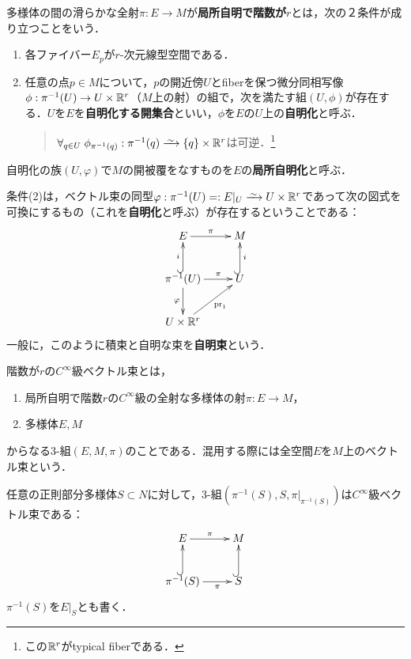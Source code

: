 \documentclass[uplatex,dvipdfmx]{jsreport}
\begin{document}
\begin{definition}[trivialization]
    多様体の間の滑らかな全射$\pi:E\to M$が\textbf{局所自明で階数が$r$}とは，次の２条件が成り立つことをいう．
    \begin{enumerate}
        \item 各ファイバー$E_p$が$r$-次元線型空間である．
        \item 任意の点$p\in M$について，$p$の開近傍$U$とfiberを保つ微分同相写像$\phi:\pi^{-1}(U)\to U\times\mathbb{R}^r$（$M$上の射）の組で，次を満たす組$(U,\phi)$が存在する．$U$を$E$を\textbf{自明化する開集合}といい，$\phi$を$E$の$U$上の\textbf{自明化}と呼ぶ．
        \begin{quote}
            $\forall_{q\in U}\;\phi_{\pi^{-1}(q)}:\pi^{-1}(q)\iso\{q\}\times\R^r$は可逆．\footnote{この$\mathbb{R}^r$がtypical fiberである．}
        \end{quote}
    \end{enumerate}
    自明化の族$(U,\varphi)$で$M$の開被覆をなすものを$E$の\textbf{局所自明化}と呼ぶ．
\end{definition}
\begin{remark}[自明化とはベクトル束の局所的な同型である]
    条件(2)は，ベクトル束の同型$\varphi:\pi^{-1}(U)=:E|_U\iso U\times\R^r$であって次の図式を可換にするもの（これを\textbf{自明化}と呼ぶ）が存在するということである：
    \[\xymatrix{
        E\ar[r]^-\pi&M\\
        \pi^{-1}(U)\ar[d]_-{\varphi}\ar@{^{(}->}[u]^-i\ar[r]^-{\pi}&U \ar@{^{(}->}[u]_-i\\
        U\times\R^r\ar[ur]_-{\pr_1}
    }\]
    一般に，このように積束と自明な束を\textbf{自明束}という．
\end{remark}

\begin{definition}
    階数が$r$の$C^\infty$級ベクトル束とは，
    \begin{enumerate}
        \item 局所自明で階数$r$の$C^\infty$級の全射な多様体の射$\pi:E\to M$，
        \item 多様体$E,M$
    \end{enumerate}
    からなる3-組$(E,M,\pi)$のことである．混用する際には全空間$E$を$M$上のベクトル束という．
\end{definition}

\begin{example}[restriction]
    任意の正則部分多様体$S\subset N$に対して，3-組$(\pi^{-1}(S),S,\pi|_{\pi^{-1}(S)})$は$C^\infty$級ベクトル束である：
    \[\xymatrix{
        E\ar[r]^-\pi&M\\
        \pi^{-1}(S) \ar@{^{(}->}[u]\ar[r]_-\pi&S \ar@{^{(}->}[u]
    }\]
    $\pi^{-1}(S)$を$E|_S$とも書く．
\end{example}
\end{document}
